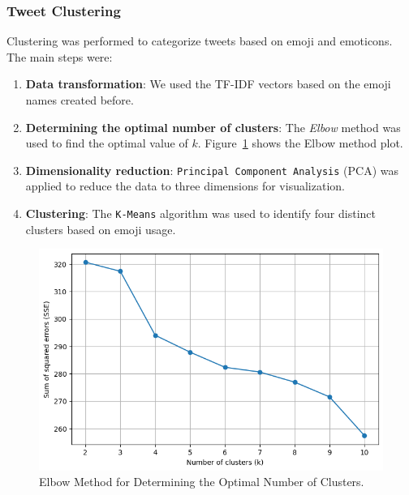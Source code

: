 \subsubsection{Tweet Clustering}
Clustering was performed to categorize tweets based on emoji and emoticons. The main steps were:
\begin{enumerate}
    \item \textbf{Data transformation}: We used the TF-IDF vectors based on the emoji names created before.
    \item \textbf{Determining the optimal number of clusters}: The \textit{Elbow} method was used to find the optimal value of \( k \). Figure~\ref{fig:elbow_method} shows the Elbow method plot.
    \item \textbf{Dimensionality reduction}: \texttt{Principal Component Analysis} (PCA) was applied to reduce the data to three dimensions for visualization.
    \item \textbf{Clustering}: The \texttt{K-Means} algorithm was used to identify four distinct clusters based on emoji usage.
\end{enumerate}

\begin{figure}
    \includegraphics[width=\columnwidth]{../../results/images/emoji_elbow.png}
    \caption{Elbow Method for Determining the Optimal Number of Clusters.}
    \label{fig:elbow_method}
\end{figure}

